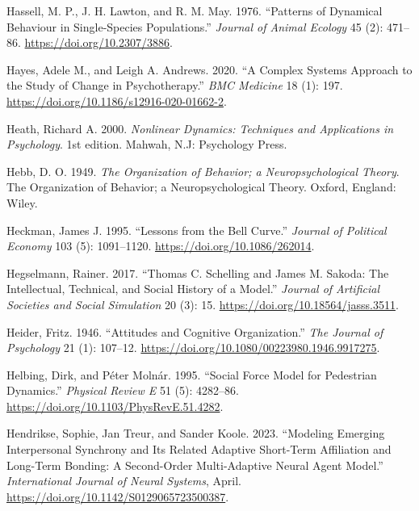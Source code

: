 \documentclass[
  a4paper,
  DIV=11,
  numbers=noendperiod,
  oneside]{scrreprt}
\newlength{\cslhangindent}
\newenvironment{CSLReferences}[2] %
 {\begin{list}{}{%
  \setlength{\itemindent}{0pt}
  \setlength{\leftmargin}{0pt}
  \setlength{\parsep}{0pt}
  \ifodd #1
   \setlength{\leftmargin}{\cslhangindent}
   \setlength{\itemindent}{-1\cslhangindent}
  \fi
  \setlength{\itemsep}{#2\baselineskip}}}
 {\end{list}}
\begin{document}
\begin{CSLReferences}{1}{0}
Hassell, M. P., J. H. Lawton, and R. M. May. 1976. {``Patterns of
{Dynamical Behaviour} in {Single-Species Populations}.''} \emph{Journal
of Animal Ecology} 45 (2): 471--86. \url{https://doi.org/10.2307/3886}.

Hayes, Adele M., and Leigh A. Andrews. 2020. {``A Complex Systems
Approach to the Study of Change in Psychotherapy.''} \emph{BMC Medicine}
18 (1): 197. \url{https://doi.org/10.1186/s12916-020-01662-2}.

Heath, Richard A. 2000. \emph{Nonlinear {Dynamics}: {Techniques} and
{Applications} in {Psychology}}. 1st edition. {Mahwah, N.J}: {Psychology
Press}.

Hebb, D. O. 1949. \emph{The Organization of Behavior; a
Neuropsychological Theory}. The Organization of Behavior; a
Neuropsychological Theory. {Oxford, England}: {Wiley}.

Heckman, James J. 1995. {``Lessons from the {Bell Curve}.''}
\emph{Journal of Political Economy} 103 (5): 1091--1120.
\url{https://doi.org/10.1086/262014}.

Hegselmann, Rainer. 2017. {``Thomas {C}. {Schelling} and {James M}.
{Sakoda}: {The Intellectual}, {Technical}, and {Social History} of a
{Model}.''} \emph{Journal of Artificial Societies and Social Simulation}
20 (3): 15. \url{https://doi.org/10.18564/jasss.3511}.

Heider, Fritz. 1946. {``Attitudes and {Cognitive Organization}.''}
\emph{The Journal of Psychology} 21 (1): 107--12.
\url{https://doi.org/10.1080/00223980.1946.9917275}.

Helbing, Dirk, and Péter Molnár. 1995. {``Social Force Model for
Pedestrian Dynamics.''} \emph{Physical Review E} 51 (5): 4282--86.
\url{https://doi.org/10.1103/PhysRevE.51.4282}.

Hendrikse, Sophie, Jan Treur, and Sander Koole. 2023. {``Modeling
{Emerging Interpersonal Synchrony} and Its {Related Adaptive Short-Term
Affiliation} and {Long-Term Bonding}: {A Second-Order Multi-Adaptive
Neural Agent Model}.''} \emph{International Journal of Neural Systems},
April. \url{https://doi.org/10.1142/S0129065723500387}.


\end{CSLReferences}
\end{document}

